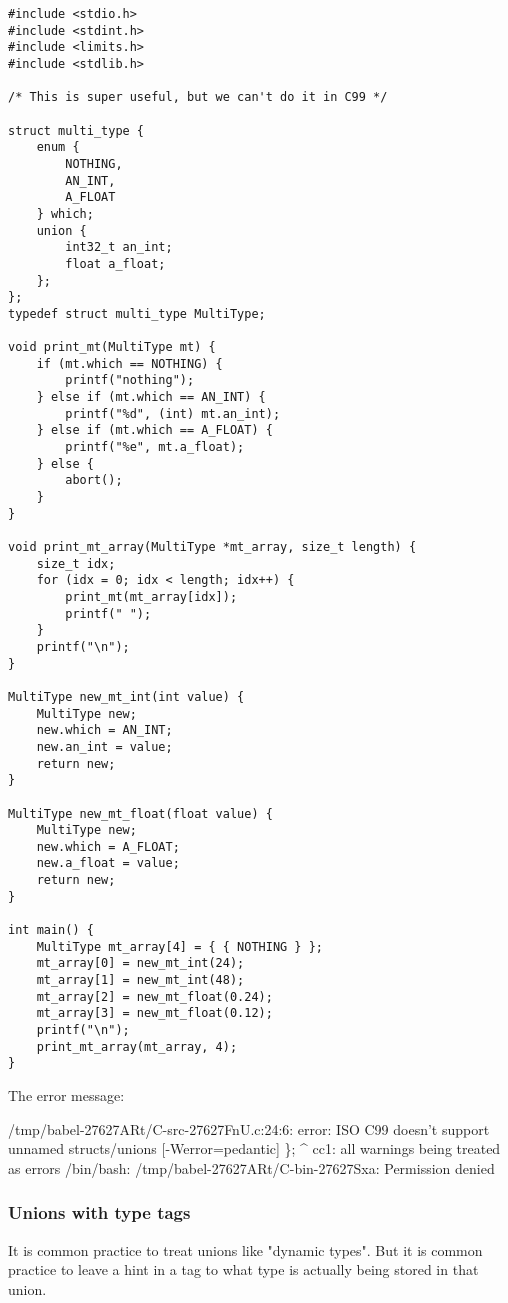 \documentclass[11pt]{article}
\begin{document}
\begin{verbatim}
#include <stdio.h>
#include <stdint.h>
#include <limits.h>
#include <stdlib.h>

/* This is super useful, but we can't do it in C99 */

struct multi_type {
    enum {
        NOTHING,
        AN_INT,
        A_FLOAT
    } which;
    union {
        int32_t an_int;
        float a_float;
    };
};
typedef struct multi_type MultiType;

void print_mt(MultiType mt) {
    if (mt.which == NOTHING) {
        printf("nothing");
    } else if (mt.which == AN_INT) {
        printf("%d", (int) mt.an_int);
    } else if (mt.which == A_FLOAT) {
        printf("%e", mt.a_float);
    } else {
        abort();
    }
}

void print_mt_array(MultiType *mt_array, size_t length) {
    size_t idx;
    for (idx = 0; idx < length; idx++) {
        print_mt(mt_array[idx]);
        printf(" ");
    }
    printf("\n");
}

MultiType new_mt_int(int value) {
    MultiType new;
    new.which = AN_INT;
    new.an_int = value;
    return new;
}

MultiType new_mt_float(float value) {
    MultiType new;
    new.which = A_FLOAT;
    new.a_float = value;
    return new;
}

int main() {
    MultiType mt_array[4] = { { NOTHING } };
    mt_array[0] = new_mt_int(24);
    mt_array[1] = new_mt_int(48);
    mt_array[2] = new_mt_float(0.24);
    mt_array[3] = new_mt_float(0.12);
    printf("\n");
    print_mt_array(mt_array, 4);
}
\end{verbatim}

The error message:

/tmp/babel-27627ARt/C-src-27627FnU.c:24:6: error: ISO C99 doesn’t support unnamed structs/unions [-Werror=pedantic]
     \};
      \^{}
cc1: all warnings being treated as errors
/bin/bash: /tmp/babel-27627ARt/C-bin-27627Sxa: Permission denied


\subsubsection{Unions with type tags}
\label{sec:orgc4f4dae}

It is common practice to treat unions like "dynamic types". But it is
common practice to leave a hint in a tag to what type is actually
being stored in that union.
\end{document}

